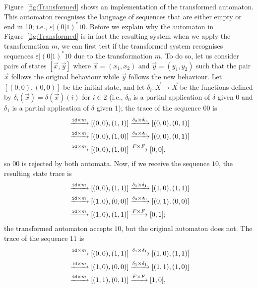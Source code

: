 Figure~\ref{fig:Transformed} shows an implementation of the transformed automaton. This automaton recognises the language of sequences that are either empty or end in 10; i.e., $\varepsilon|(0|1)^*10$. 
Before we explain why the automaton in Figure~\ref{fig:Transformed} is in fact the resulting system when we apply the transformation $m$, we can first test if the transformed system recognises sequences $\varepsilon|(0|1)^*10$ due to the transformation $m$. %
To do so, let us consider pairs of states $[\vec{x},\vec{y}]$ where $\vec{x}=(x_1,x_2)$ and $\vec{y}=(y_1,y_2)$ such that the pair $\vec{x}$ follows the original behaviour while $\vec{y}$ follows the new behaviour. 
Let $[(0,0),(0,0)]$ be the initial state, and let $\delta_i\colon \vec{X}\rightarrow \vec{X}$ be the functions defined by $\delta_i(\vec{x})=\delta(\vec{x})(i)$ for $i \in 2$ (i.e., $\delta_0$ is a partial application of $\delta$ given $0$ and $\delta_1$ is a partial application of $\delta$ given 1); %
the trace of the sequence $00$ is 
\begin{align*}
   [(0,0),(0,0)]&\xrightarrow{\id\times m}[(0,0),(1,1)]\xrightarrow{\delta_0\times\delta_0}[(0,0),(0,1)]\\
   &\xrightarrow{\id\times m}[(0,0),(1,0)]\xrightarrow{\delta_0\times\delta_0}[(0,0),(0,1)]\\
   &\xrightarrow{\id\times m}[(0,0),(1,0)]\xrightarrow{F\times F}[0,0],
\end{align*}
so $00$ is rejected by both automata. 
Now, if we receive the sequence $10$, the resulting state trace is 
\begin{align*}
    [(0,0),(0,0)]&\xrightarrow{\id\times m}[(0,0),(1,1)]\xrightarrow{\delta_1\times\delta_1}[(1,0),(1,1)]\\
   &\xrightarrow{\id\times m}[(1,0),(0,0)]\xrightarrow{\delta_0\times\delta_0}[(0,1),(0,0)]\\
   &\xrightarrow{\id\times m}[(1,0),(1,1)]\xrightarrow{F\times F}[0,1];
\end{align*}
the transformed automaton accepts $10$, but the original automaton does not. 
The trace of the sequence $11$ is 
\begin{align*}
    [(0,0),(0,0)]&\xrightarrow{\id\times m}[(0,0),(1,1)]\xrightarrow{\delta_1\times\delta_1}[(1,0),(1,1)]\\
   &\xrightarrow{\id\times m}[(1,0),(0,0)]\xrightarrow{\delta_1\times\delta_1}[(1,1),(1,0)]\\
   &\xrightarrow{\id\times m}[(1,1),(0,1)]\xrightarrow{F\times F}[1,0],
\end{align*}
